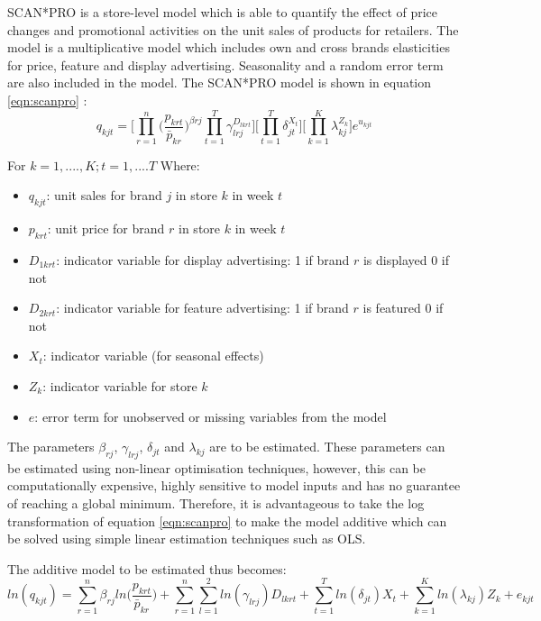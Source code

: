 \documentclass[a4paper,11pt]{article}
\begin{document}
SCAN*PRO is a store-level model which is able to quantify the effect of price changes and promotional activities on the unit sales of products for retailers. The model is a multiplicative model which includes own and cross brands elasticities for price, feature and display advertising. Seasonality and a random error term are also included in the model. The SCAN*PRO model is shown in equation \ref{eqn:scanpro}  \citep{leeflang_how_2002}:
\begin{equation}
\label{eqn:scanpro}
    q_{kjt} = \Bigg[\prod_{r=1}^n\Bigg(\frac{p_{krt}}{\bar{p}_{kr}}\Bigg)^{\beta rj}\prod_{t=1}^{T}\gamma_{lrj}^{D_{lkrt}}\Bigg]\Bigg[\prod_{t=1}^{T}\delta_{jt}^{X_{t}}\Bigg]\Bigg[\prod_{k=1}^{K}\lambda_{kj}^{Z_{k}}\Bigg]e^{u_{kjt}} 
\end{equation}

For $k = 1, ...., K; t=1,....T$
\newline
\newline
Where:
\begin{itemize}
    \item $q_{kjt}$: unit sales for brand $j$ in store $k$ in week $t$
    \item $p_{krt}$: unit price for brand $r$ in store $k$ in week $t$
    \item $D_{1krt}$: indicator variable for display advertising: 1 if brand $r$ is displayed 0 if not
    \item $D_{2krt}$: indicator variable for feature advertising: 1 if brand $r$ is featured 0 if not
    \item $X_t$: indicator variable (for seasonal effects)
    \item $Z_k$: indicator variable for store $k$
    \item $e$: error term for unobserved or missing variables from the model
\end{itemize}

The parameters $\beta_{rj}$, $\gamma_{lrj}$, $\delta_{jt}$ and $\lambda_{kj}$ are to be estimated. These parameters can be estimated using non-linear optimisation techniques, however, this can be computationally expensive, highly sensitive to model inputs and has no guarantee of reaching a global minimum. Therefore, it is advantageous to take the log transformation of equation \ref{eqn:scanpro} to make the model additive which can be solved using simple linear estimation techniques such as OLS. 

The additive model to be estimated thus becomes:
\begin{equation}
\label{eqn:scanprolog}
    ln(q_{kjt}) = \sum_{r=1}^n{\beta _{rj}ln\Bigg(\frac{p_{krt}}{\bar{p}_{kr}}\Bigg)+ \sum_{r=1}^n\sum_{l=1}^{2}{ln(\gamma_{lrj}){D_{lkrt}}}} + \sum_{t=1}^T{ln(\delta_{jt})X_t} + \sum_{k=1}^K{ln(\lambda_{kj})Z_k} + e_{kjt}
\end{equation}
\end{document}
